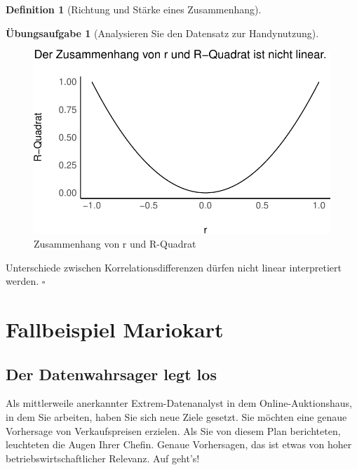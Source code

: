 \documentclass[
  a4paper,
  DIV=11]{scrreprt}
\theoremstyle{definition}
\newtheorem{exercise}{Übungsaufgabe}[chapter]
\theoremstyle{definition}
\theoremstyle{definition}
\newtheorem{definition}{Definition}[chapter]
\theoremstyle{remark}
\begin{document}
\begin{definition}[Richtung und Stärke eines
Zusammenhang]
\begin{exercise}[Analysieren Sie den Datensatz zur
Handynutzung]
\begin{figure}
{\includegraphics{080-regression1_files/figure-pdf/fig-r-r2-1.pdf}

}

\caption{\label{fig-r-r2}Zusammenhang von r und R-Quadrat}

\end{figure}%

\begin{tcolorbox}[enhanced jigsaw, leftrule=.75mm, opacitybacktitle=0.6, colback=white, colframe=quarto-callout-caution-color-frame, coltitle=black, colbacktitle=quarto-callout-caution-color!10!white, opacityback=0, left=2mm, breakable, titlerule=0mm, toptitle=1mm, bottomtitle=1mm, rightrule=.15mm, title=\textcolor{quarto-callout-caution-color}{\faFire}\hspace{0.5em}{Vorsicht}, arc=.35mm, bottomrule=.15mm, toprule=.15mm]

Unterschiede zwischen Korrelationsdifferenzen dürfen nicht linear
interpretiert werden. \(\square\)

\end{tcolorbox}

\section{Fallbeispiel Mariokart}\label{fallbeispiel-mariokart}

\subsection{Der Datenwahrsager legt
los}\label{der-datenwahrsager-legt-los}

Als mittlerweile anerkannter Extrem-Datenanalyst in dem
Online-Auktionshaus, in dem Sie arbeiten, haben Sie sich neue Ziele
gesetzt. Sie möchten eine genaue Vorhersage von Verkaufspreisen
erzielen. Als Sie von diesem Plan berichteten, leuchteten die Augen
Ihrer Chefin. Genaue Vorhersagen, das ist etwas von hoher
betriebswirtschaftlicher Relevanz. Auf geht's!


\end{exercise}
\end{definition}
\end{document}

